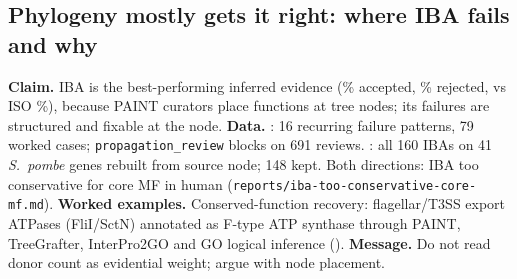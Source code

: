 \subsection{Phylogeny mostly gets it right: where IBA fails and why}\label{sec:dd-iba}
\textbf{Claim.} IBA is the best-performing inferred evidence (\accIBA\% accepted, \rejIBA\% rejected,
vs ISO \rejISO\%), because PAINT curators place functions at tree nodes; its failures are
structured and fixable at the node.
\textbf{Data.} : 16 recurring failure patterns, 79 worked cases;
\texttt{propagation\_review} blocks on 691 reviews. : all 160 IBAs on
41 \textit{S.\ pombe} genes rebuilt from source node; 148 kept. Both directions: IBA too
conservative for core MF in human (\texttt{reports/iba-too-conservative-core-mf.md}).
\textbf{Worked examples.}  Conserved-function recovery: flagellar/T3SS export
ATPases (FliI/SctN) annotated as F-type ATP synthase through PAINT, TreeGrafter, InterPro2GO and
GO logical inference ().
\textbf{Message.} Do not read donor count as evidential weight; argue with node placement.
